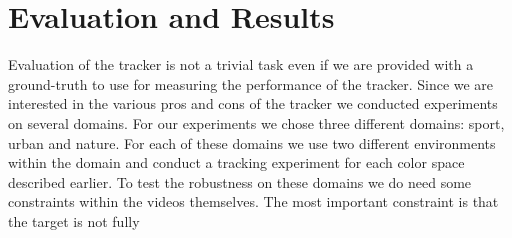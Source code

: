 \documentclass[a4paper,11pt]{article}
\begin{document}
	\section{Evaluation and Results}
		Evaluation of the tracker is not a trivial task even if we are provided with a ground-truth
		to use for measuring the performance of the tracker. Since we are interested in the various
		pros and cons of the tracker we conducted experiments on several domains. For our experiments
		we chose three different domains: sport, urban and nature. For each of these domains we use
		two different environments within the domain and conduct a tracking experiment for each color
		space described earlier. To test the robustness on these domains we do need some constraints
		within the videos themselves. The most important constraint is that the target is not fully
\end{document}
